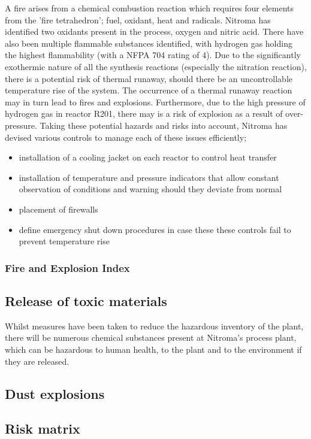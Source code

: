A fire arises from a chemical combustion reaction which requires four elements from the 'fire tetrahedron'; fuel, oxidant, heat and radicals. Nitroma has identified two oxidants present in the process, oxygen and nitric acid. There have also been multiple flammable substances identified, with hydrogen gas holding the highest flammability (with a NFPA 704 rating of 4). Due to the significantly exothermic nature of all the synthesis reactions (especially the nitration reaction), there is a potential risk of thermal runaway, should there be an uncontrollable temperature rise of the system. The occurrence of a thermal runaway reaction may in turn lead to fires and explosions. Furthermore, due to the high pressure of hydrogen gas in reactor R201, there may is a risk of explosion as a result of over-pressure. Taking these potential hazards and risks into account, Nitroma has devised various controls to manage each of these issues efficiently;

\begin{itemize}
    \item installation of a cooling jacket on each reactor to control heat transfer
    \item installation of temperature and pressure indicators that allow constant observation of conditions and warning should they deviate from normal
    \item placement of firewalls 
    \item define emergency shut down procedures in case these these controls fail to prevent temperature rise
\end{itemize}

\subsubsection{Fire and Explosion Index}




\subsection{Release of toxic materials}

Whilst measures have been taken to reduce the hazardous inventory of the plant, there will be numerous chemical substances present at Nitroma's process plant, which can be hazardous to human health, to the plant and to the environment if they are released.  


\subsection{Dust explosions}






\subsection{Risk matrix}

